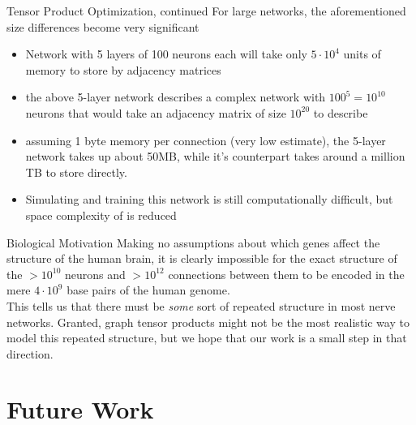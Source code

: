 \documentclass[leqno,presentation,unknownkeysallowed]{beamer}
\begin{document}
\begin{frame}{Tensor Product Optimization, continued}
For large networks, the aforementioned size differences become very significant
\begin{itemize}
    \item Network with 5 layers of 100 neurons each will take only $5 \cdot 10^4$ units of memory to store by adjacency matrices
    \item the above 5-layer network describes a complex network with $100^{5}=10^{10}$ neurons that would take an adjacency matrix of size $10^{20}$ to describe
    \item assuming 1 byte memory per connection (very low estimate), the 5-layer network takes up about 50MB, while it's counterpart takes around a million TB to store directly. 
    \item Simulating and training this network is still computationally difficult, but space complexity  of is reduced
\end{itemize}
\end{frame}

\begin{frame}{Biological Motivation}
Making no assumptions about which genes affect the structure of the human brain, it is clearly impossible for the exact structure of the $>10^{10}$ neurons and $>10^{12}$ connections between them to be encoded in the mere $4 \cdot 10^{9}$ base pairs of the human genome. \\
\vspace{1em}
This tells us that there must be \textit{some} sort of repeated structure in most nerve networks. Granted, graph tensor products might not be the most realistic way to model this repeated structure, but we hope that our work is a small step in that direction.

\end{frame}

\section{Future Work}
\end{document}
